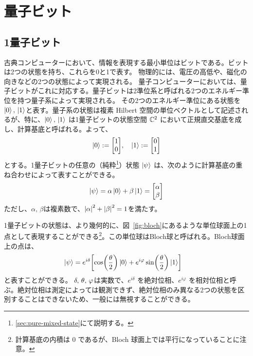 \begin{comment}
See examples in the textbook.\\

\subsection{Composite systems}
\textbf{Postulates 4}: The state space of a composite physical system is the tensor product of the state spaces of the component physical systems. $\ket{\psi_1} \ot \ket{\psi_2} \ot \cdots \ot \ket{\psi_n}$

\end{comment}


\section{量子ビット}
\subsection*{1量子ビット}
古典コンピューターにおいて、情報を表現する最小単位はビットである。ビットは2つの状態を持ち、これらを0と1で表す。
物理的には、電圧の高低や、磁化の向きなどの2つの状態によって実現される。
量子コンピューターにおいては、量子ビットがこれに対応する。量子ビットは2準位系と呼ばれる2つのエネルギー準位を持つ量子系によって実現される。
その2つのエネルギー準位にある状態を$\ket{0},\,\ket{1}$と表す。量子系の状態は複素 Hilbert 空間の単位ベクトルとして記述されるが、特に、$\ket{0},\,\ket{1}$ は1量子ビットの状態空間 $\mathbb{C}^2$ において正規直交基底を成し、計算基底と呼ばれる。よって、
\begin{align}
    \ket{0} := \mqty[1 \\ 0], \quad \ket{1} := \mqty[0 \\ 1]
\end{align}
とする。1量子ビットの任意の（純粋\footnote{\ref{sec:pure-mixed-state}にて説明する。}）状態 $\ket{\psi}$ は、次のように計算基底の重ね合わせによって表すことができる。
\begin{align}
    \ket{\psi} = \alpha\ket{0} + \beta\ket{1} = \mqty[\alpha \\ \beta]
\end{align}
ただし、$\alpha,\,\beta$は複素数で、$\abs{\alpha}^2 + \abs{\beta}^2 = 1$を満たす。

1量子ビットの状態は、より幾何的に、図~\ref{fig:bloch}にあるような単位球面上の1点として表現することができる\footnote{計算基底の内積は $0$ であるが、Bloch 球面上では平行になっていることに注意。}。この単位球はBloch球と呼ばれる。Bloch球面上の点は、
\begin{align}\label{eq:quantum-state}
    \ket{\psi} &= e^{i\delta} \qty[ \cos(\frac{\theta}{2})\ket{0} + e^{i\varphi}\sin(\frac{\theta}{2})\ket{1} ]
\end{align}
と表すことができる。
$\delta,\,\theta,\,\varphi$は実数で、$e^{i\delta}$ を絶対位相、$e^{i\varphi}$ を相対位相と呼ぶ。絶対位相は測定によっては観測できず、絶対位相のみ異なる2つの状態を区別することはできないため、一般には無視することができる。

